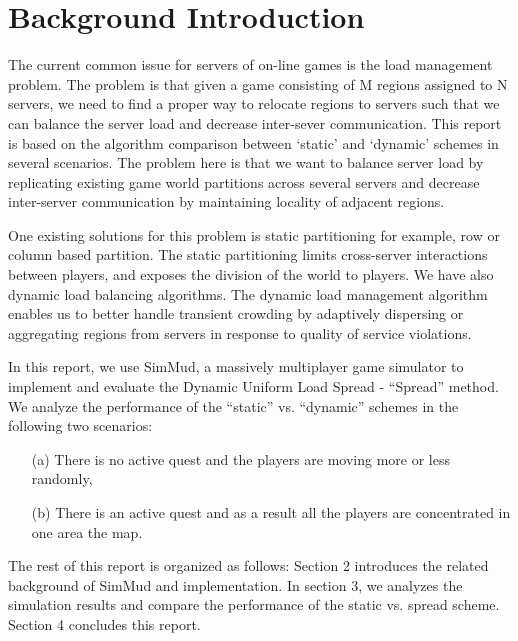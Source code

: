 \documentclass[12pt,a4paper]{article} %
\theoremstyle{definition}
\theoremstyle{remark}
\begin{document}
	\title{\rmfamily\normalfont{}}
	\author{, \\
	, 	}
	\date{} %
	
	\maketitle
	
	
\section{Background Introduction}
The current common issue for servers of on-line games is the load management problem. The problem is that given a game consisting of M regions assigned to N servers, we need to find a proper way to relocate regions to servers such that we can balance the server load and decrease inter-sever communication. This report is based on the algorithm comparison between `static' and `dynamic' schemes in several scenarios. The problem here is that we want to balance server load by replicating existing game world partitions across several servers and decrease inter-server communication by maintaining locality of adjacent regions. 

\vspace{3mm}

One existing solutions for this problem is static partitioning for example, row or column based partition. The static partitioning limits cross-server interactions between
players, and exposes the division of the world to players. We have also dynamic load balancing algorithms. 
The dynamic load management algorithm enables us to better handle transient crowding by adaptively dispersing or aggregating regions from servers in response to quality of service violations.


\vspace{3mm}

In this report, we use SimMud, a massively multiplayer game simulator to implement and evaluate the Dynamic Uniform Load Spread -  ``Spread'' method. 
We analyze the performance of the “static” vs. “dynamic” schemes in the following two scenarios:
\begin{itemize}
	\item [(a)] There is no active quest and the players are moving more or less randomly,
	\item [(b)] There is an active quest and as a result all the players are concentrated in one area the map. 
\end{itemize}
 The rest of this report is organized
 as follows: Section 2 introduces the related background of SimMud and implementation. In section 3, we  analyzes the simulation results and compare the performance of the static vs. spread scheme. Section 4 concludes this report.
\end{document}
